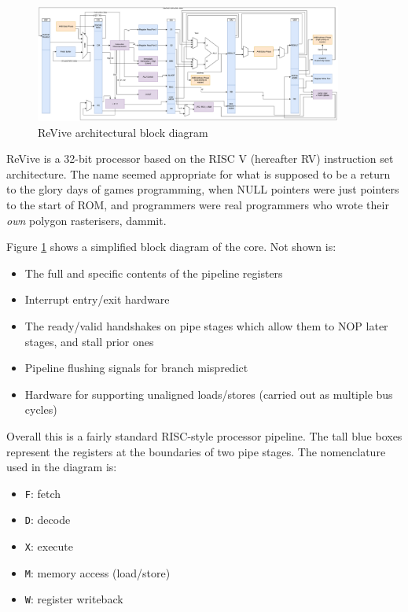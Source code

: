 \documentclass{article}
\begin{document}
\begin{figure}
\caption{ReVive architectural block diagram}
\label{diagram:cpu_pipeline}
\centering
\includegraphics[width=0.9\textwidth]{diagrams/cpu_full.pdf}
\end{figure}

ReVive is a 32-bit processor based on the RISC V (hereafter RV) instruction set architecture. The name seemed appropriate for what is supposed to be a return to the glory days of games programming, when NULL pointers were just pointers to the start of ROM, and programmers were real programmers who wrote their \textit{own} polygon rasterisers, dammit.

Figure \ref{diagram:cpu_pipeline} shows a simplified block diagram of the core. Not shown is:
\begin{itemize}
\item The full and specific contents of the pipeline registers
\item Interrupt entry/exit hardware
\item The ready/valid handshakes on pipe stages which allow them to NOP later stages, and stall prior ones
\item Pipeline flushing signals for branch mispredict
\item Hardware for supporting unaligned loads/stores (carried out as multiple bus cycles)
\end{itemize}

Overall this is a fairly standard RISC-style processor pipeline. The tall blue boxes represent the registers at the boundaries of two pipe stages. The nomenclature used in the diagram is:

\begin{itemize}
\item \texttt{F}: fetch
\item \texttt{D}: decode
\item \texttt{X}: execute
\item \texttt{M}: memory access (load/store)
\item \texttt{W}: register writeback
\end{itemize}
\end{document}
